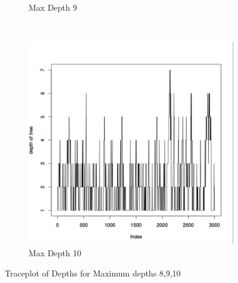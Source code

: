 \documentclass{article}
\begin{document}
\begin{figure}[H]
\begin{subfigure}[b]{0.3\textwidth}
                \caption{Max Depth 9}
                \label{fig:tiger}
        \end{subfigure}
        ~ %
        \begin{subfigure}[b]{0.3\textwidth}
                \centering
                \includegraphics[width=\textwidth]{depth_c10}
                \caption{Max Depth 10}
                \label{fig:mouse}
        \end{subfigure}
        \caption{Traceplot of Depths for Maximum depths 8,9,10}\label{fig:Boxplots78_10}
\end{figure}
\end{document}
